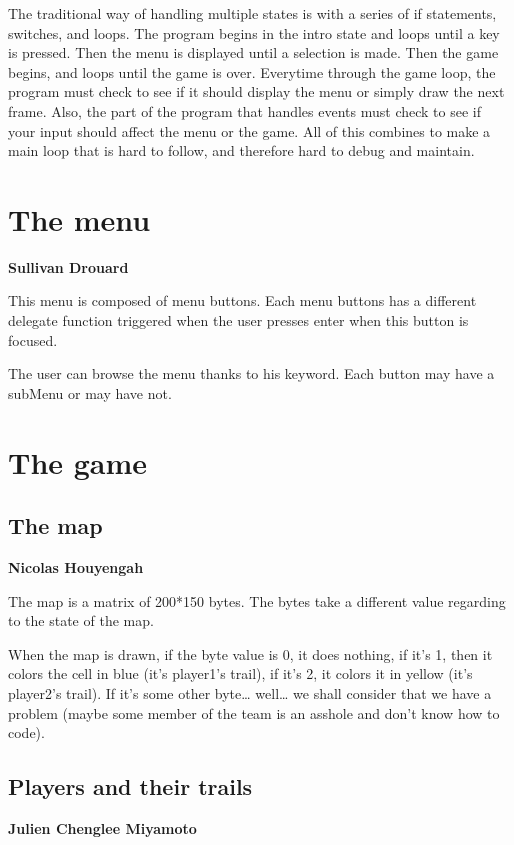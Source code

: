 \documentclass[pdftex,12pt,a4paper]{report}
\begin{document}
The traditional way of handling multiple states is with a series of if
statements, switches, and loops. The program begins in the intro state
and loops until a key is pressed. Then the menu is displayed until a
selection is made. Then the game begins, and loops until the game is
over. Everytime through the game loop, the program must check to see if
it should display the menu or simply draw the next frame. Also, the part
of the program that handles events must check to see if your input
should affect the menu or the game. All of this combines to make a main
loop that is hard to follow, and therefore hard to debug and maintain.

\section{The menu}

\textbf{Sullivan Drouard}

This menu is composed of menu buttons. Each menu buttons has a different
delegate function triggered when the user presses enter when this button
is focused.

The user can browse the menu thanks to his keyword. Each button may have
a subMenu or may have not.

\section{The game}

\subsection{The map}

\textbf{Nicolas Houyengah}

The map is a matrix of 200*150 bytes. The bytes take a different value
regarding to the state of the map.

When the map is drawn, if the byte value is 0, it does nothing, if it's
1, then it colors the cell in blue (it's player1's trail), if it's 2, it
colors it in yellow (it's player2's trail). If it's some other
byte\ldots{} well\ldots{} we shall consider that we have a problem
(maybe some member of the team is an asshole and don't know how to
code).

\subsection{Players and their trails}

\textbf{Julien Chenglee Miyamoto}
\end{document}
